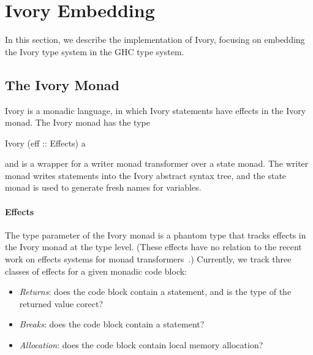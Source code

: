 \section{Ivory Embedding}
\label{sec:ivory-embedding}

In this section, we describe the implementation of Ivory, focusing on embedding
the Ivory type system in the GHC type system.

\subsection{The Ivory Monad}
\label{sec:ivory-monad}

Ivory is a monadic language, in which Ivory statements have effects in the Ivory
monad. The Ivory monad has the type

\begin{code}
Ivory (eff :: Effects) a
\end{code}

\noindent
and is a wrapper for a writer monad transformer over a state monad. The writer
monad writes statements into the Ivory abstract syntax tree, and the
state monad is used to generate fresh names for variables.

\paragraph{Effects}
The  type parameter of the Ivory monad is a phantom type that tracks
effects in the Ivory monad at the type level. (These effects have no relation to
the recent work on effects systems for monad transformers~\cite{effects}.)
Currently, we track three classes of effects for a given monadic code block:

\begin{itemize}
\item \emph{Returns}: does the code block contain a  statement, and
  is the type of the returned value corect?
\item \emph{Breaks}: does the code block contain a  statement?
\item \emph{Allocation}: does the code block contain local memory allocation?
\end{itemize}


